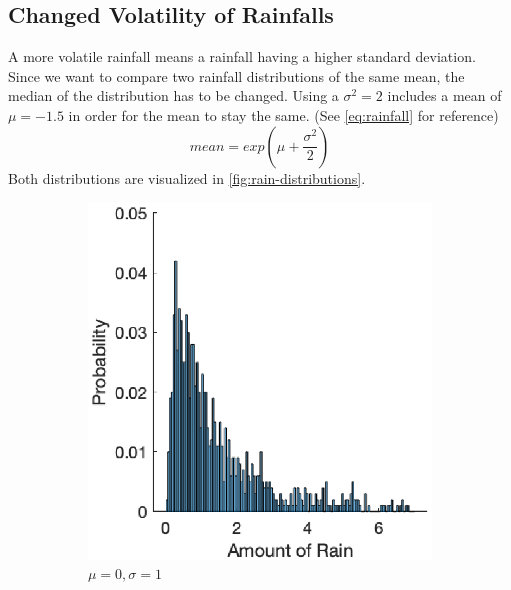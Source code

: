 \documentclass[12pt, a4paper, oneside]{article}
\begin{document}
\subsection{Changed Volatility of Rainfalls}
A more volatile rainfall means a rainfall having a higher standard deviation.
Since we want to compare two rainfall distributions of the same mean, the median of the distribution has to be changed.
Using a $\sigma^2=2$ includes a mean of $\mu=-1.5$ in order for the mean to stay the same. 
(See \ref{eq:rainfall} for reference) 
\begin{equation}
	mean = exp(\mu+\frac{\sigma^2}{2}) \label{eq:rainfall}
\end{equation} 
Both distributions are visualized in \ref{fig:rain-distributions}.
\begin{figure}
	\begin{subfigure}{0.5\textwidth}
		\centering
		\includegraphics[width=1\textwidth]{figures/rainfall-default.eps}
		\caption{$\mu=0, \sigma=1$}
		\label{fig:rainfall-default}
	\end{subfigure}%
	\begin{subfigure}{.5\textwidth}
		\centering

\end{subfigure}
\end{figure}
\end{document}
